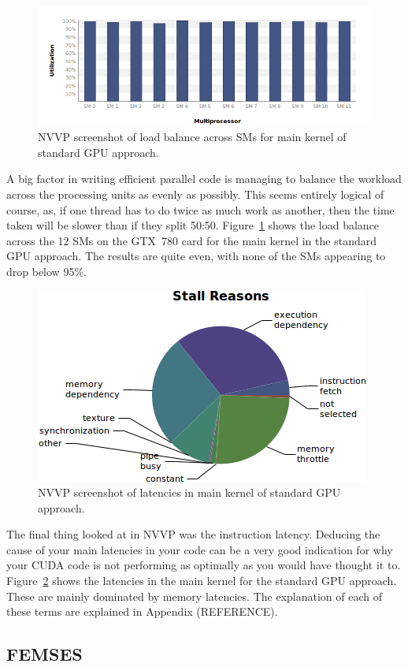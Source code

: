 \begin{figure}
	\centering
	\includegraphics[width = 0.7\linewidth]{Figures/sparse_load}
	\caption{NVVP screenshot of load balance across SMs for main kernel of standard GPU approach.}
	\label{fig:sparse_load}
\end{figure}
A big factor in writing efficient parallel code is managing to balance the workload across the processing units as evenly as possibly. This seems entirely logical of course, as, if one thread has to do twice as much work as another, then the time taken will be slower than if they split 50:50. Figure~\ref{fig:sparse_load} shows the load balance across the 12 SMs on the GTX~780 card for the main kernel in the standard GPU approach. The results are quite even, with none of the SMs appearing to drop below 95\%.

\begin{figure}
	\centering
	\includegraphics[width = 0.55\linewidth]{Figures/sparse_instruction_latency}
	\caption{NVVP screenshot of latencies in main kernel of standard GPU approach.}
	\label{fig:sparse_latencies}
\end{figure}
The final thing looked at in NVVP was the instruction latency. Deducing the cause of your main latencies in your code can be a very good indication for why your CUDA code is not performing as optimally as you would have thought it to. Figure~\ref{fig:sparse_latencies} shows the latencies in the main kernel for the standard GPU approach. These are mainly dominated by memory latencies. The explanation of each of these terms are explained in Appendix (REFERENCE).

\subsection{FEMSES}

